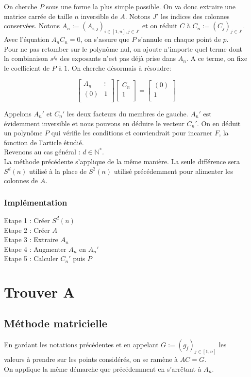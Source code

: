 \documentclass{article}
\begin{document}
	On cherche $P$ sous une forme la plus simple possible. On va donc extraire une matrice carrée de taille $n$ inversible de $A$. Notons $J'$ les indices des colonnes conservées. Notons $A_n:=(A_{i,j})_{i\in[1,n],j\in J'}$ et on réduit $C$ à $C_n:=(C_{j})_{j\in J'}$. Avec l'équation $A_n C_n = 0$, on s'assure que $P$ s'annule en chaque point de $p$.\\
	Pour ne pas retomber sur le polynôme nul, on ajoute n'importe quel terme dont la combinaison $s^{j_0}$ des exposants n'est pas déjà prise dans $A_n$. A ce terme, on fixe le coefficient de $P$ à $1$. On cherche désormais à résoudre:
	
	\begin{equation}
		\begin{bmatrix}
			A_n & \vdots \\
			(0)   & 1 \\
		\end{bmatrix} 
		\begin{bmatrix}
			C_n\\
			1\\
		\end{bmatrix} = \begin{bmatrix}
			(0)\\
			1\\
		\end{bmatrix}
	\end{equation}
	
	Appelons $A_n'$ et $C_n'$ les deux facteurs du membres de gauche. $A_n'$ est évidemment inversible et nous pouvons en déduire le vecteur $C_n'$. 
	On en déduit un polynôme $P$ qui vérifie les conditions et conviendrait pour incarner $F$, la fonction de l'article étudié.\\
	
	
	Revenons au cas général : $d\in\mathbb{N}^*$.\\
	La méthode précédente s'applique de la même manière. La seule différence sera $S^d(n)$ utilisé à la place de $S^2(n)$ utilisé précédemment pour alimenter les colonnes de $A$.

	\subsubsection{Implémentation}
	Etape 1 : Créer $S^d(n)$\\
	Etape 2 : Créer $A$\\
	Etape 3 : Extraire $A_n$\\
	Etape 4 : Augmenter $A_n$ en $A_n'$\\
	Etape 5 : Calculer $C_n'$ puis $P$\\

	\section{Trouver A}
	\subsection{Méthode matricielle}
	En gardant les notations précédentes et en appelant $G:=(g_j)_{j\in[1,n]}$ les valeurs à prendre sur les points considérés, on se ramène à $AC=G$.\\
	On applique la même démarche que précédemment en s'arrêtant à $A_n$.
\end{document}

